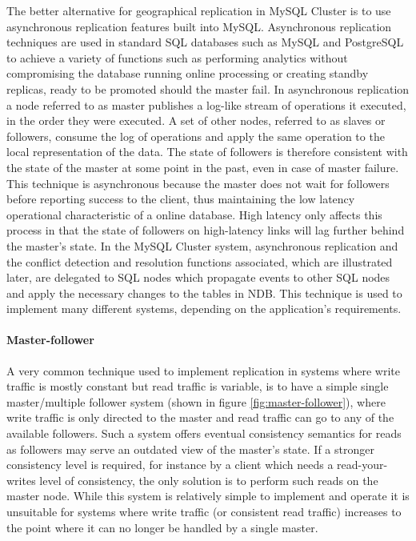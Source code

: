 The better alternative for geographical replication in MySQL Cluster is to use asynchronous replication features built into MySQL.
Asynchronous replication techniques are used in standard SQL databases such as MySQL and PostgreSQL to achieve a variety of functions such as performing analytics without compromising the database running online processing or creating standby replicas, ready to be promoted should the master fail.
In asynchronous replication a node referred to as master publishes a log-like stream of operations it executed, in the order they were executed.
A set of other nodes, referred to as slaves or followers, consume the log of operations and apply the same operation to the local representation of the data.
The state of followers is therefore consistent with the state of the master at some point in the past, even in case of master failure.
This technique is asynchronous because the master does not wait for followers before reporting success to the client, thus maintaining the low latency operational characteristic of a online database.
High latency only affects this process in that the state of followers on high-latency links will lag further behind the master's state.
In the MySQL Cluster system, asynchronous replication and the conflict detection and resolution functions associated, which are illustrated later, are delegated to SQL nodes which propagate events to other SQL nodes and apply the necessary changes to the tables in NDB.
This technique is used to implement many different systems, depending on the application's requirements.

\paragraph{Master-follower}
A very common technique used to implement replication in systems where write traffic is mostly constant but read traffic is variable, is to have a simple single master/multiple follower system (shown in figure \ref{fig:master-follower}), where write traffic is only directed to the master and read traffic can go to any of the available followers.
Such a system offers eventual consistency semantics for reads as followers may serve an outdated view of the master's state.
If a stronger consistency level is required, for instance by a client which needs a read-your-writes level of consistency, the only solution is to perform such reads on the master node.
While this system is relatively simple to implement and operate it is unsuitable for systems where write traffic (or consistent read traffic) increases to the point where it can no longer be handled by a single master.

